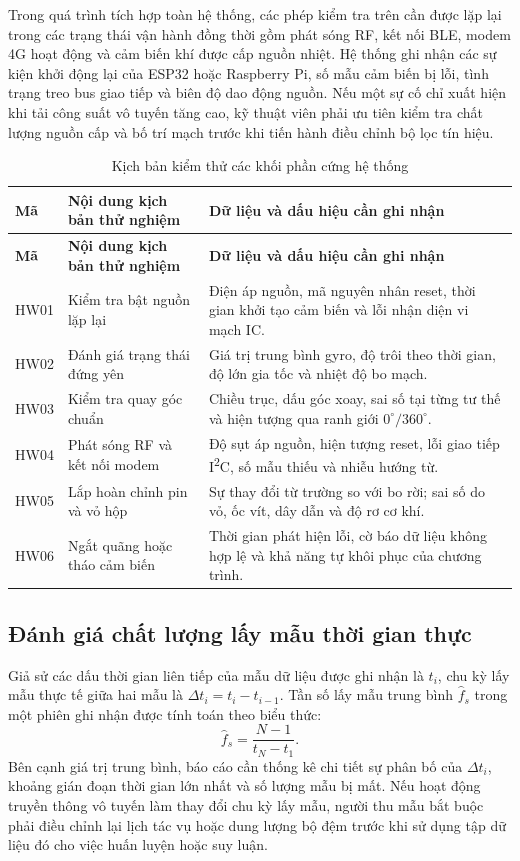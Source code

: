 Trong quá trình tích hợp toàn hệ thống, các phép kiểm tra trên cần được lặp lại trong các trạng thái vận hành đồng thời gồm phát sóng RF, kết nối BLE, modem 4G hoạt động và cảm biến khí được cấp nguồn nhiệt. Hệ thống ghi nhận các sự kiện khởi động lại của ESP32 hoặc Raspberry Pi, số mẫu cảm biến bị lỗi, tình trạng treo bus giao tiếp và biên độ dao động nguồn. Nếu một sự cố chỉ xuất hiện khi tải công suất vô tuyến tăng cao, kỹ thuật viên phải ưu tiên kiểm tra chất lượng nguồn cấp và bố trí mạch trước khi tiến hành điều chỉnh bộ lọc tín hiệu.

\begingroup\SmallTable
\begin{longtable}{|P{40bp}|P{155bp}|P{213bp}|}
\caption{Kịch bản kiểm thử các khối phần cứng hệ thống}\label{tab:hwtest}\\\hline
\textbf{Mã}&\textbf{Nội dung kịch bản thử nghiệm}&\textbf{Dữ liệu và dấu hiệu cần ghi nhận}\\\hline\endfirsthead
\hline\textbf{Mã}&\textbf{Nội dung kịch bản thử nghiệm}&\textbf{Dữ liệu và dấu hiệu cần ghi nhận}\\\hline\endhead
HW01&Kiểm tra bật nguồn lặp lại&Điện áp nguồn, mã nguyên nhân reset, thời gian khởi tạo cảm biến và lỗi nhận diện vi mạch IC.\\\hline
HW02&Đánh giá trạng thái đứng yên&Giá trị trung bình gyro, độ trôi theo thời gian, độ lớn gia tốc và nhiệt độ bo mạch.\\\hline
HW03&Kiểm tra quay góc chuẩn&Chiều trục, dấu góc xoay, sai số tại từng tư thế và hiện tượng qua ranh giới $0^\circ/360^\circ$.\\\hline
HW04&Phát sóng RF và kết nối modem&Độ sụt áp nguồn, hiện tượng reset, lỗi giao tiếp I\textsuperscript{2}C, số mẫu thiếu và nhiễu hướng từ.\\\hline
HW05&Lắp hoàn chỉnh pin và vỏ hộp&Sự thay đổi từ trường so với bo rời; sai số do vỏ, ốc vít, dây dẫn và độ rơ cơ khí.\\\hline
HW06&Ngắt quãng hoặc tháo cảm biến&Thời gian phát hiện lỗi, cờ báo dữ liệu không hợp lệ và khả năng tự khôi phục của chương trình.\\\hline
\end{longtable}\endgroup

\subsection{Đánh giá chất lượng lấy mẫu thời gian thực}
Giả sử các dấu thời gian liên tiếp của mẫu dữ liệu được ghi nhận là $t_i$, chu kỳ lấy mẫu thực tế giữa hai mẫu là $\Delta t_i = t_i - t_{i-1}$. Tần số lấy mẫu trung bình $\hat{f}_s$ trong một phiên ghi nhận được tính toán theo biểu thức:
\begin{equation}
\hat f_s=\frac{N-1}{t_N-t_1}.
\end{equation}
Bên cạnh giá trị trung bình, báo cáo cần thống kê chi tiết sự phân bố của $\Delta t_i$, khoảng gián đoạn thời gian lớn nhất và số lượng mẫu bị mất. Nếu hoạt động truyền thông vô tuyến làm thay đổi chu kỳ lấy mẫu, người thu mẫu bắt buộc phải điều chỉnh lại lịch tác vụ hoặc dung lượng bộ đệm trước khi sử dụng tập dữ liệu đó cho việc huấn luyện hoặc suy luận.

